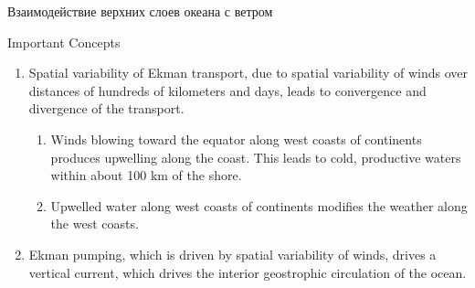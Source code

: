 \begin{chapter}{Взаимодействие верхних слоев океана с ветром}
\begin{section}{Important Concepts}
\begin{enumerate}
\item 
Spatial variability of Ekman transport, due to spatial variability of
winds over distances of hundreds of kilometers and days, leads to
convergence and divergence of the transport.
%

  \begin{enumerate}
    \item Winds blowing toward the equator along west coasts of
     continents produces upwelling along the
     coast. This leads to cold, productive waters within about 100 km
     of the shore.
%

    \item Upwelled water along west coasts of continents modifies the
     weather along the west coasts.
%
  \end{enumerate}

\item 
Ekman pumping, which is driven by spatial
variability of winds, drives a vertical current, which drives the
interior geostrophic circulation of the
ocean.
%
\end{enumerate}
\end{section}
\end{chapter}